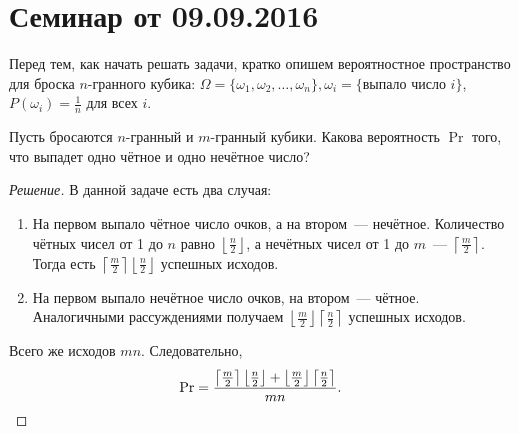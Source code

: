 \section{Семинар от 09.09.2016}
Перед тем, как начать решать задачи, кратко опишем вероятностное пространство для броска \(n\)-гранного кубика: \(\Omega = \{\omega_1, \omega_2, \ldots, \omega_n\}, \omega_i = \{\text{выпало число }i\}\), \(P(\omega_i) = \frac{1}{n}\) для всех \(i\).

\begin{problem}
    Пусть бросаются \(n\)-гранный и \(m\)-гранный кубики. Какова вероятность \(\Pr\) того, что выпадет одно чётное и одно нечётное число?
\end{problem}
\begin{proof}[Решение]
    В данной задаче есть два случая:
    \begin{enumerate}
        \item На первом выпало чётное число очков, а на втором~--- нечётное. Количество чётных чисел от 1 до \(n\) равно \(\left\lfloor\frac{n}{2}\right\rfloor\), а нечётных чисел от 1 до \(m\)~--- \(\left\lceil\frac{m}{2}\right\rceil\). Тогда есть \(\left\lceil\frac{m}{2}\right\rceil\left\lfloor\frac{n}{2}\right\rfloor\) успешных исходов.
        \item На первом выпало нечётное число очков, на втором~--- чётное. Аналогичными рассуждениями получаем \(\left\lfloor\frac{m}{2}\right\rfloor\left\lceil\frac{n}{2}\right\rceil\) успешных исходов.
    \end{enumerate}
    Всего же исходов \(mn\). Следовательно, \[\Pr =\frac{\left\lceil\frac{m}{2}\right\rceil\left\lfloor\frac{n}{2}\right\rfloor + \left\lfloor\frac{m}{2}\right\rfloor\left\lceil\frac{n}{2}\right\rceil}{mn}.\qedhere\]
\end{proof}

